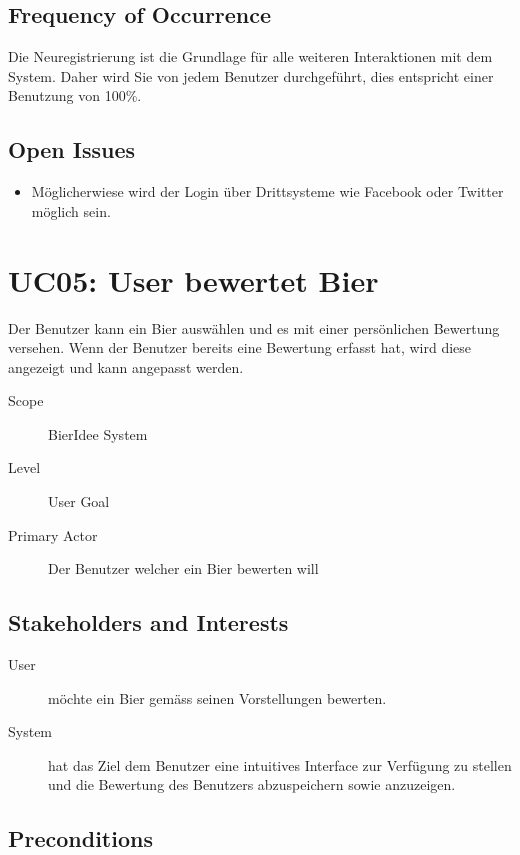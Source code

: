 \documentclass[10pt,a4paper]{scrartcl}
\begin{document}
\subsection*{Frequency of Occurrence}

Die Neuregistrierung ist die Grundlage für alle weiteren Interaktionen mit dem System. Daher wird Sie von jedem Benutzer durchgeführt, dies entspricht einer Benutzung von 100\%.


\subsection*{Open Issues}

\begin{itemize}
\item Möglicherwiese wird der Login über Drittsysteme wie Facebook oder Twitter möglich sein.
\end{itemize}


\section*{UC05: User bewertet Bier}
Der Benutzer kann ein Bier auswählen und es mit einer persönlichen Bewertung versehen. Wenn der Benutzer bereits eine Bewertung erfasst hat, wird diese angezeigt und kann angepasst werden.

\begin{description}
\item[Scope] BierIdee System
\item[Level] User Goal
\item[Primary Actor] Der Benutzer welcher ein Bier bewerten will
\end{description}


\subsection*{Stakeholders and Interests}

\begin{description}
\item[User] möchte ein Bier gemäss seinen Vorstellungen bewerten.
\item[System] hat das Ziel dem Benutzer eine intuitives Interface zur Verfügung zu stellen und die Bewertung des Benutzers abzuspeichern sowie anzuzeigen.
\end{description}


\subsection*{Preconditions}
\end{document}
